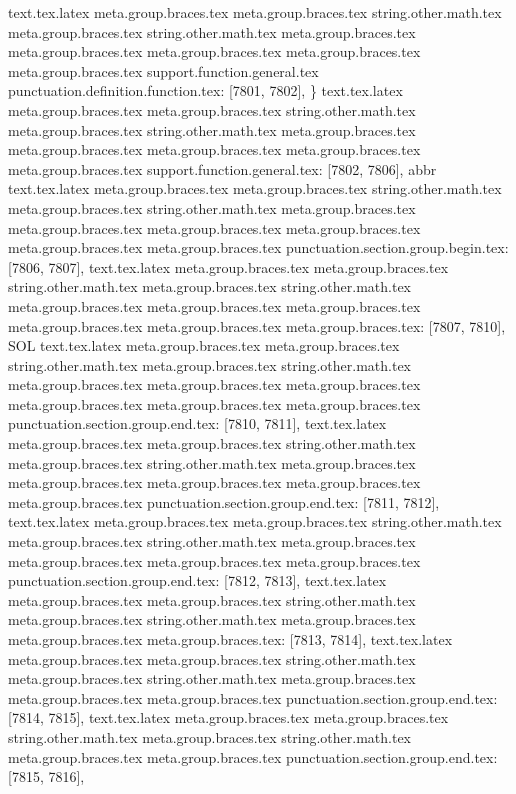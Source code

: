 {{{{{{{{{{{{{{{{{{{{{{{{{{{{{{{{{{{{{{{{{{{{{{{{{{{{{{{{{{{{{{{{{{{{{{{{{{{{{{{{{{{{{{{{{{{{{{{{{{{{{{{{{{{{{{{{{{{{{{{{{{{{{{{{{{{{{{{{{{{{{{{{{{{{{{{{{{{{{{{{{{{{{{{{{{{{{{{{{{{{{{{{{{{{{{{{{{{{{{{{{{{{{{{{{{{{{{{{{{{{{{{{{{{{{{{{{text.tex.latex meta.group.braces.tex meta.group.braces.tex string.other.math.tex meta.group.braces.tex string.other.math.tex meta.group.braces.tex meta.group.braces.tex meta.group.braces.tex meta.group.braces.tex meta.group.braces.tex support.function.general.tex punctuation.definition.function.tex: [7801, 7802], {\}
text.tex.latex meta.group.braces.tex meta.group.braces.tex string.other.math.tex meta.group.braces.tex string.other.math.tex meta.group.braces.tex meta.group.braces.tex meta.group.braces.tex meta.group.braces.tex meta.group.braces.tex support.function.general.tex: [7802, 7806], {abbr}
text.tex.latex meta.group.braces.tex meta.group.braces.tex string.other.math.tex meta.group.braces.tex string.other.math.tex meta.group.braces.tex meta.group.braces.tex meta.group.braces.tex meta.group.braces.tex meta.group.braces.tex meta.group.braces.tex punctuation.section.group.begin.tex: [7806, 7807], {{}
text.tex.latex meta.group.braces.tex meta.group.braces.tex string.other.math.tex meta.group.braces.tex string.other.math.tex meta.group.braces.tex meta.group.braces.tex meta.group.braces.tex meta.group.braces.tex meta.group.braces.tex meta.group.braces.tex: [7807, 7810], {SOL}
text.tex.latex meta.group.braces.tex meta.group.braces.tex string.other.math.tex meta.group.braces.tex string.other.math.tex meta.group.braces.tex meta.group.braces.tex meta.group.braces.tex meta.group.braces.tex meta.group.braces.tex meta.group.braces.tex punctuation.section.group.end.tex: [7810, 7811], {}}
text.tex.latex meta.group.braces.tex meta.group.braces.tex string.other.math.tex meta.group.braces.tex string.other.math.tex meta.group.braces.tex meta.group.braces.tex meta.group.braces.tex meta.group.braces.tex meta.group.braces.tex punctuation.section.group.end.tex: [7811, 7812], {}}
text.tex.latex meta.group.braces.tex meta.group.braces.tex string.other.math.tex meta.group.braces.tex string.other.math.tex meta.group.braces.tex meta.group.braces.tex meta.group.braces.tex meta.group.braces.tex punctuation.section.group.end.tex: [7812, 7813], {}}
text.tex.latex meta.group.braces.tex meta.group.braces.tex string.other.math.tex meta.group.braces.tex string.other.math.tex meta.group.braces.tex meta.group.braces.tex meta.group.braces.tex: [7813, 7814], { }
text.tex.latex meta.group.braces.tex meta.group.braces.tex string.other.math.tex meta.group.braces.tex string.other.math.tex meta.group.braces.tex meta.group.braces.tex meta.group.braces.tex punctuation.section.group.end.tex: [7814, 7815], {}}
text.tex.latex meta.group.braces.tex meta.group.braces.tex string.other.math.tex meta.group.braces.tex string.other.math.tex meta.group.braces.tex meta.group.braces.tex punctuation.section.group.end.tex: [7815, 7816], {}}
}}}}}}}}}}}}}}}}}}}}}}}}}}}}}}}}}}}}}}}}}}}}}}}}}}}}}}}}}}}}}}}}}}}}}}}}}}}}}}}}}}}}}}}}}}}}}}}}}}}}}}}}}}}}}}}}}}}}}}}}}}}}}}}}}}}}}}}}}}}}}}}}}}}}}}}}}}}}}}}}}}}}}}}}}}}}}}}}}}}}}}}}}}}}}}}}}}}}}}}}}}}}}}}}}}}}}}}}}}}}}}}}}}}}}}
